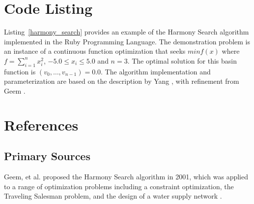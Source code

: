 \documentclass[a4paper, 11pt]{article}
\begin{document}
\section{Code Listing}
\label{sec:code}
Listing~\ref{harmony_search} provides an example of the Harmony Search algorithm implemented in the Ruby Programming Language. 
The demonstration problem is an instance of a continuous function optimization that seeks $min f(x)$ where $f=\sum_{i=1}^n x_{i}^2$, $-5.0\leq x_i \leq 5.0$ and $n=3$. The optimal solution for this basin function is $(v_0,\ldots,v_{n-1})=0.0$.
The algorithm implementation and parameterization are based on the description by Yang \cite{Yang2009}, with refinement from Geem \cite{Geem2010a}.



\section{References}
\label{sec:references}

% 
% 
\subsection{Primary Sources}
Geem, et al. proposed the Harmony Search algorithm in 2001, which was applied to a range of optimization problems including a constraint optimization, the Traveling Salesman problem, and the design of a water supply network \cite{Geem2001}.

% 
% 
\end{document}
